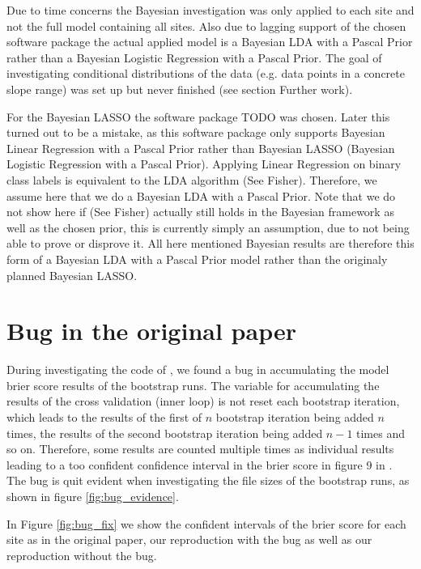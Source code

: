 \documentclass[twoside,twocolumn]{article}
\begin{document}
Due to time concerns the Bayesian investigation was only applied to each site and not the full model containing all sites.
Also due to lagging support of the chosen software package the actual applied model is a Bayesian LDA with a Pascal Prior rather than a Bayesian Logistic Regression with a Pascal Prior.
The goal of investigating conditional distributions of the data (e.g. data points in a concrete slope range) was set up but never finished (see section Further work).

For the Bayesian LASSO the software package TODO was chosen.
Later this turned out to be a mistake, as this software package only supports Bayesian Linear Regression with a Pascal Prior rather than Bayesian LASSO (Bayesian Logistic Regression with a Pascal Prior).
Applying Linear Regression on binary class labels is equivalent to the LDA algorithm (See Fisher).
Therefore, we assume here that we do a Bayesian LDA with a Pascal Prior.
Note that we do not show here if (See Fisher) actually still holds in the Bayesian framework as well as the chosen prior, this is currently simply an assumption, due to not being able to prove or disprove it.
All here mentioned Bayesian results are therefore this form of a Bayesian LDA with a Pascal Prior model rather than the originaly planned Bayesian LASSO.


\section{Bug in the original paper}

During investigating the code of \cite{zweifel_samarin_meusburger_alewell_2021}, we found a bug in accumulating the model brier score results of the bootstrap runs.
The variable for accumulating the results of the cross validation (inner loop) is not reset each bootstrap iteration, which leads to the results of the first of $n$ bootstrap iteration being added $n$ times, the results of the second bootstrap iteration being added $n-1$ times and so on.
Therefore, some results are counted multiple times as individual results leading to a too confident confidence interval in the brier score in figure 9 in \cite{zweifel_samarin_meusburger_alewell_2021}.
The bug is quit evident when investigating the file sizes of the bootstrap runs, as shown in figure \ref{fig:bug_evidence}.

In Figure \ref{fig:bug_fix} we show the confident intervals of the brier score for each site as in the original paper, our reproduction with the bug as well as our reproduction without the bug.
\end{document}
